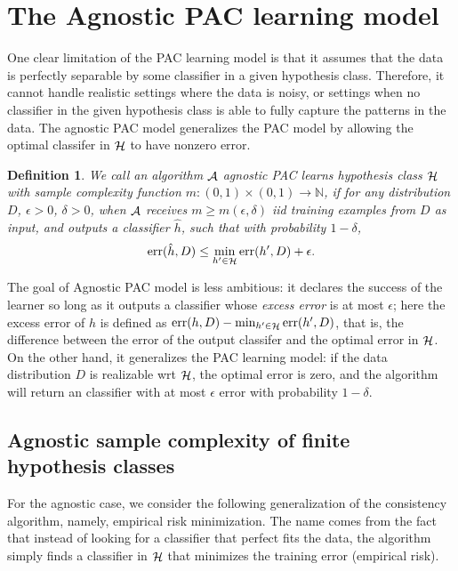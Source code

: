\documentclass{article}
\newtheorem{definition}{Definition}
\DeclareMathOperator*{\err}{{\rm err}}
\DeclareMathOperator*{\Hcal}{{\cal H}}
\DeclareMathOperator*{\Acal}{{\cal A}}
\newcommand{\NN}{\mathbb{N}}
\begin{document}
\section{The Agnostic PAC learning model}

One clear limitation of the PAC learning model is that it assumes that the data is perfectly
separable by some classifier in a given hypothesis class.
Therefore, it cannot handle realistic settings
where the data is noisy, or settings when no classifier in the given hypothesis class is able to fully capture the patterns in the data. The agnostic PAC model generalizes the PAC
model by allowing the optimal classifer in $\Hcal$ to have nonzero error.

\begin{definition}
We call an algorithm $\Acal$ agnostic PAC learns hypothesis class $\Hcal$ with sample complexity
function $m: (0,1) \times (0,1) \to \NN$, if for any distribution $D$, $\epsilon > 0$, $\delta > 0$,
when $\Acal$ receives $m \geq m(\epsilon, \delta)$ iid training examples from $D$ as input,
 and outputs
a classifier $\hat{h}$, such that with probability $1-\delta$,
\[ \err(\hat{h}, D) \leq \min_{h' \in \Hcal} \err(h',D) + \epsilon. \]
\end{definition}

The goal of Agnostic PAC model is less ambitious: it declares the success of the learner so long as it outputs a classifier whose {\em excess error} is at most $\epsilon$; here the excess error of $h$ is defined as $\err(h, D) - \min_{h' \in \Hcal} \err(h',D)$, that is, the difference between the error of the output classifer and the optimal error in $\Hcal$. On the other hand, it generalizes the PAC learning model: if the data distribution $D$ is realizable wrt $\Hcal$, the optimal error is zero, and the algorithm will return an classifier with at most $\epsilon$ error with probability $1-\delta$.

\subsection{Agnostic sample complexity of finite hypothesis classes}

For the agnostic case, we consider the following generalization of the
consistency algorithm, namely, empirical risk minimization. The name comes
from the fact that instead of looking for a classifier that perfect fits the
data, the algorithm simply finds a classifier in $\Hcal$ that minimizes the
training error (empirical risk).
\end{document}
